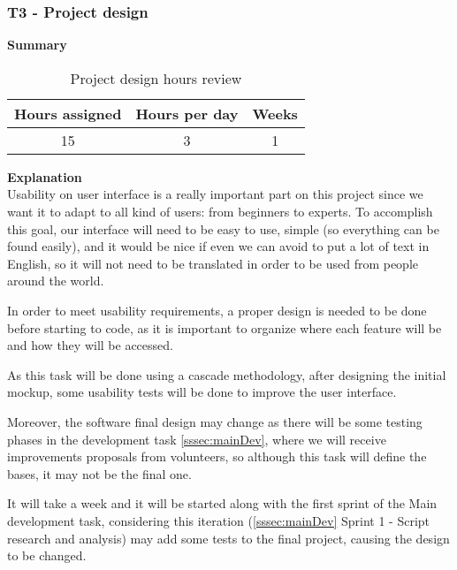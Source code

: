 \subsubsection{T3 - Project design}
\label{sssec:design}

\textbf{Summary}
\begin{table}[ht]
\centering
  \begin{tabular}{| c | c | c |}
  \hline Hours assigned & Hours per day & Weeks \\ \hline  
   15 & 3 & 1        \\ \hline
  \end{tabular}
  \caption{Project design hours review} \vspace{3pt}
  \label{tab:design}
\end{table}

\par{\textbf{Explanation}}\\
Usability on user interface is a really important part on this project since we want it to adapt to all kind of users: from beginners to experts. To accomplish this goal, our interface will need to be easy to use, simple (so everything can be found easily), and it would be nice if even we can avoid to put a lot of text in English, so it will not need to be translated in order to be used from people around the world. 

In order to meet usability requirements, a proper design is needed to be done before starting to code, as it is important to organize where each feature will be and how they will be accessed. 

As this task will be done using a cascade methodology, after designing the initial mockup, some usability tests will be done to improve the user interface.

Moreover, the software final design may change as there will be some testing phases in the development task \ref{sssec:mainDev}, where we will receive improvements proposals from volunteers, so although this task will define the bases, it may not be the final one.

It will take a week and it will be started along with the first sprint of the Main development task, considering this iteration (\ref{sssec:mainDev} Sprint 1 - Script research and analysis) may add some tests to the final project, causing the design to be changed.
